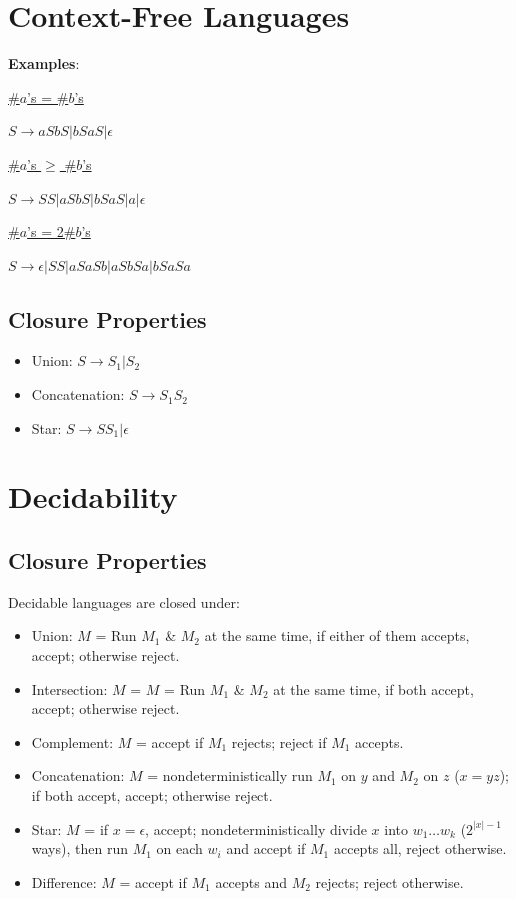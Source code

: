 \documentclass[10pt,landscape,a4paper]{article}
\newcommand{\abs}[1]{\left | #1 \right |}
\begin{document}
\begin{multicols*}{3}
\section{Context-Free Languages}

\textbf{Examples}:

\underline{\#$a$'s = \#$b$'s}

$S \rightarrow aSbS | bSaS | \epsilon$

\underline{\#$a$'s $\geq$ \#$b$'s}

$S \rightarrow SS | aSbS | bSaS | a | \epsilon$

\underline{\#$a$'s = 2\#$b$'s}

$S \rightarrow \epsilon | SS | aSaSb | aSbSa | bSaSa$

\subsection{Closure Properties}

\begin{itemize}
    \item Union: $S \rightarrow S_1 | S_2$
    \item Concatenation: $S \rightarrow S_1S_2$
    \item Star: $S \rightarrow SS_1 | \epsilon$
\end{itemize}

\section{Decidability}

\subsection{Closure Properties}

Decidable languages are closed under:

\begin{itemize}
    \item Union: $M$ = Run $M_1$ \& $M_2$ at the same time, if either of them accepts, accept; otherwise reject.
    \item Intersection: $M$ = $M$ = Run $M_1$ \& $M_2$ at the same time, if both accept, accept; otherwise reject.
    \item Complement: $M$ = accept if $M_1$ rejects; reject if $M_1$ accepts.
    \item Concatenation: $M$ = nondeterministically run $M_1$ on $y$ and $M_2$ on $z$ ($x = yz$); if both accept, accept; otherwise reject.
    \item Star: $M$ = if $x = \epsilon$, accept; nondeterministically divide $x$ into $w_1\ldots w_k$ ($2^{\abs{x}-1}$ ways), then run $M_1$ on each $w_i$ and accept if $M_1$ accepts all, reject otherwise.
    \item Difference: $M$ = accept if $M_1$ accepts and $M_2$ rejects; reject otherwise.
\end{itemize}


\end{multicols*}
\end{document}

